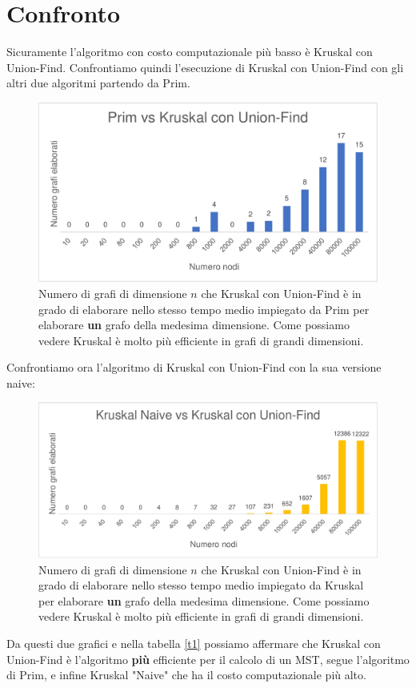 \section{Confronto}
Sicuramente l'algoritmo con costo computazionale più basso è Kruskal con Union-Find.
Confrontiamo quindi l'esecuzione di Kruskal con Union-Find con gli altri due algoritmi partendo da Prim. 
\begin{figure}[H]
\centering
\includegraphics[scale=0.5]{grafici/primvskruskaluf.pdf}
\caption{Numero di grafi di dimensione $n$ che Kruskal con Union-Find è in grado di elaborare nello stesso tempo medio impiegato da Prim per elaborare \textbf{un} grafo  della medesima dimensione. Come possiamo vedere Kruskal è molto più efficiente in grafi di grandi dimensioni.}
\end{figure}
Confrontiamo ora l'algoritmo di Kruskal con Union-Find con la sua versione naive:
\begin{figure}[H]
\centering
\includegraphics[scale=0.5]{grafici/kruskalvskruskaluf.pdf}
\caption{Numero di grafi di dimensione $n$ che Kruskal con Union-Find è in grado di elaborare nello stesso tempo medio impiegato da Kruskal per elaborare \textbf{un} grafo della medesima dimensione. Come possiamo vedere Kruskal è molto più efficiente in grafi di grandi dimensioni.}
\end{figure}
Da questi due grafici e nella tabella \ref{t1} possiamo affermare che Kruskal con Union-Find è l'algoritmo \textbf{più} efficiente per il calcolo di un MST, segue l'algoritmo di Prim, e infine Kruskal "Naive" che ha il costo computazionale più alto.
